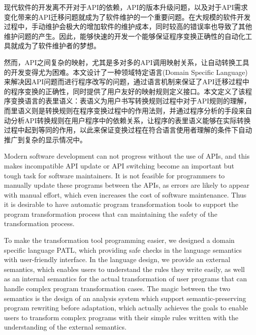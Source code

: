 
\begin{cabstract}
	现代软件的开发离不开对于API的依赖，API的版本升级问题，以及对于API需求变化带来的API迁移问题就成为了软件维护的一个重要问题。在大规模的软件开发过程中，手动维护会极大的增加软件的维护成本，同时较高的错误率也导致了其他维护问题的产生。因此，能够快速的开发一个能够保证程序变换正确性的自动化工具就成为了软件维护者的梦想。

	然而，API之间复杂的映射，尤其是多对多的API调用映射关系，让自动转换工具的开发变得尤为困难。本文设计了一种领域特定语言(Domain Specific Language)来解决因API问题而进行程序改写的问题，通过语言机制来保证了API迁移过程中的程序变换的正确性，同时提供了用户友好的映射规则定义接口。本文定义了该程序变换语言的表里语义：表语义为用户书写转换规则过程中对于API规则的理解，而里语义则是转换规则在程序变换过程中的作用法则，并通过程序分析的手段来自动分析API转换规则在用户程序中的依赖关系，让程序的表里语义能够在实际转换过程中起到等同的作用，以此来保证变换过程在符合语言使用者理解的条件下自动推广到复杂的显示情况中。
\end{cabstract}

\begin{eabstract}
	Modern software development can not progress without the use of APIs, and this makes incompatible API update or API switching become an important but tough task for software maintainers. It is not feasible for programmers to manually update these programs between the APIs, as errors are likely to appear with manual effort, which even increases the cost of software maintenance. Thus it is desirable to have automatic program transformation tools to support the program transformation process that can maintaining the safety of the transformation process.

	To make the transformation tool programming easier, we designed a domain specific language PATL, which providing safe checks in the language semantics with user-friendly interface. In the language design, we provide an external semantics, which enables users to understand the rules they write easily, as well as an internal semantics for the actual transformation of user programs that can handle complex program transformation cases. The magic between the two semantics is the design of an analysis system which support semantic-preserving program rewriting before adaptation, which actually achieves the goals to enable users to transform complex programs with their simple rules written with the understanding of the external semantics.
\end{eabstract}

